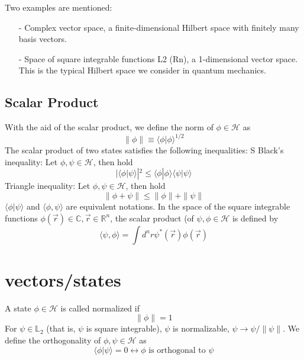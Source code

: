Two examples are mentioned:
\begin{enumerate}
    \item[-] Complex vector space, a finite-dimensional Hilbert space with finitely many basis vectors.
    \item[-] Space of square integrable functions L2 (Rn), a 1-dimensional vector space. This is the typical Hilbert space we consider in quantum mechanics.
\end{enumerate}

\subsection{Scalar Product}
With the aid of the scalar product, we define the norm of $\phi\in\mathcal{H}$ as
\begin{equation}
    \|\phi\| \equiv\langle\phi | \phi\rangle^{1 / 2}
\end{equation}
The scalar product of two states satisfies the following inequalities: S Black's inequality: Let $\phi,\psi\in\mathcal{H}$, then hold
\begin{equation}
    |\langle\phi | \psi\rangle|^{2} \leq\langle\phi | \phi\rangle\langle\psi | \psi\rangle
\end{equation}
Triangle inequality: Let $\phi,\psi\in\mathcal{H}$, then hold
\begin{equation}
    \|\phi+\psi\| \leq\|\phi\|+\|\psi\|
\end{equation}
$\langle\phi|\psi\rangle$ and $\langle\phi,\psi\rangle$ are equivalent notations. In the space of the square integrable functions $\phi(\vec{r})\in\mathbb{C},\vec{r}\in\mathbb{R}^n$, the scalar product (of $\psi,\phi\in\mathcal{H}$ is defined by
\begin{equation}
    \langle\psi, \phi\rangle=\int d^{n} r \psi^{*}(\vec{r}) \phi(\vec{r})
\end{equation}

\section{vectors/states}
A state $\phi\in\mathcal{H}$ is called normalized if
\begin{equation}
    \|\phi\|=1
\end{equation}
For $\psi\in\mathbb{L}_2$ (that is, $\psi$ is square integrable), $\psi$ is normalizable, $\psi\to\psi/\parallel\psi\parallel$. We define the orthogonality of $\phi,\psi\in\mathcal{H}$ as
\begin{equation}
    \langle\phi | \psi\rangle= 0 \leftrightarrow \phi \text { is orthogonal to } \psi
    \end{equation}
